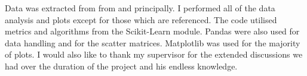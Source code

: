 
\cleardoublepage


\begin{acknowledgements}

Data was extracted from from \cite{Cappellari2011} and \cite{Krajnovic2013} principally. I performed all of the data analysis and plots except for those which are referenced. The code utilised metrics and algorithms from the Scikit-Learn module. Pandas were also used for data handling and for the scatter matrices. Matplotlib was used for the majority of plots. I would also like to thank my supervisor for the extended discussions we had over the duration of the project and his endless knowledge.

\end{acknowledgements}
